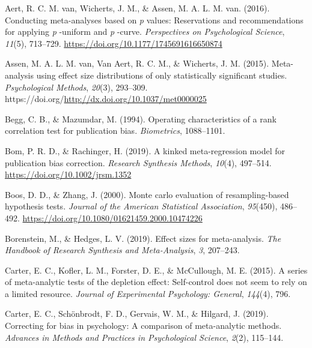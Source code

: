 \documentclass[
  man, donotrepeattitle,floatsintext]{apa7}
\newlength{\cslhangindent}
\newenvironment{CSLReferences}[2] %
 {\begin{list}{}{%
  \setlength{\itemindent}{0pt}
  \setlength{\leftmargin}{0pt}
  \setlength{\parsep}{0pt}
  \ifodd #1
   \setlength{\leftmargin}{\cslhangindent}
   \setlength{\itemindent}{-1\cslhangindent}
  \fi
  \setlength{\itemsep}{#2\baselineskip}}}
 {\end{list}}
\begin{document}
\label{refs}
\begin{CSLReferences}{1}{0}
Aert, R. C. M. van, Wicherts, J. M., \& Assen, M. A. L. M. van. (2016). Conducting meta-analyses based on \emph{p} values: Reservations and recommendations for applying \emph{p} -uniform and \emph{p} -curve. \emph{Perspectives on Psychological Science}, \emph{11}(5), 713--729. \url{https://doi.org/10.1177/1745691616650874}

Assen, M. A. L. M. van, Van Aert, R. C. M., \& Wicherts, J. M. (2015). {Meta-analysis using effect size distributions of only statistically significant studies}. \emph{Psychological Methods}, \emph{20}(3), 293--309. https://doi.org/\url{http://dx.doi.org/10.1037/met0000025}

Begg, C. B., \& Mazumdar, M. (1994). Operating characteristics of a rank correlation test for publication bias. \emph{Biometrics}, 1088--1101.

Bom, P. R. D., \& Rachinger, H. (2019). A kinked meta-regression model for publication bias correction. \emph{Research Synthesis Methods}, \emph{10}(4), 497--514. \url{https://doi.org/10.1002/jrsm.1352}

Boos, D. D., \& Zhang, J. (2000). Monte carlo evaluation of resampling-based hypothesis tests. \emph{Journal of the American Statistical Association}, \emph{95}(450), 486--492. \url{https://doi.org/10.1080/01621459.2000.10474226}

Borenstein, M., \& Hedges, L. V. (2019). Effect sizes for meta-analysis. \emph{The Handbook of Research Synthesis and Meta-Analysis}, \emph{3}, 207--243.

Carter, E. C., Kofler, L. M., Forster, D. E., \& McCullough, M. E. (2015). A series of meta-analytic tests of the depletion effect: Self-control does not seem to rely on a limited resource. \emph{Journal of Experimental Psychology: General}, \emph{144}(4), 796.

Carter, E. C., Schönbrodt, F. D., Gervais, W. M., \& Hilgard, J. (2019). Correcting for bias in psychology: A comparison of meta-analytic methods. \emph{Advances in Methods and Practices in Psychological Science}, \emph{2}(2), 115--144.


\end{CSLReferences}
\end{document}
